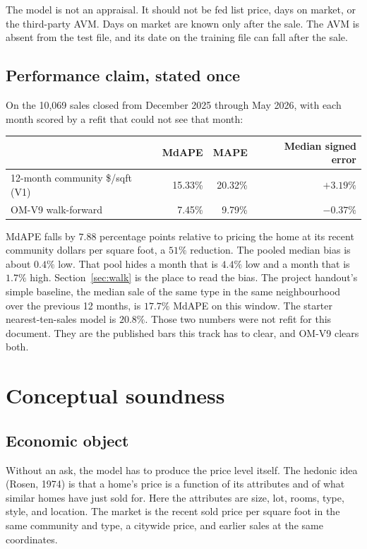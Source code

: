 \documentclass[11pt]{article}
\newcommand{\modelid}{OM-V9}
\begin{document}
The model is not an appraisal. It should not be fed list price, days on market, or the third-party AVM. Days on market are known only after the sale. The AVM is absent from the test file, and its date on the training file can fall after the sale.

\subsection{Performance claim, stated once}

On the 10,069 sales closed from December 2025 through May 2026, with each month scored by a refit that could not see that month:

\begin{center}
\begin{tabular}{lrrr}
\toprule
 & MdAPE & MAPE & Median signed error \\
\midrule
12-month community \$/sqft (V1) & 15.33\% & 20.32\% & \(+3.19\%\) \\
\modelid{} walk-forward & 7.45\% & 9.79\% & \(-0.37\%\) \\
\bottomrule
\end{tabular}
\end{center}

MdAPE falls by \(7.88\) percentage points relative to pricing the home at its recent community dollars per square foot, a \(51\%\) reduction. The pooled median bias is about \(0.4\%\) low. That pool hides a month that is \(4.4\%\) low and a month that is \(1.7\%\) high. Section~\ref{sec:walk} is the place to read the bias. The project handout's simple baseline, the median sale of the same type in the same neighbourhood over the previous 12 months, is \(17.7\%\) MdAPE on this window. The starter nearest-ten-sales model is \(20.8\%\). Those two numbers were not refit for this document. They are the published bars this track has to clear, and \modelid{} clears both.

\section{Conceptual soundness}
\label{sec:concept}

\subsection{Economic object}

Without an ask, the model has to produce the price level itself. The hedonic idea (Rosen, 1974) is that a home's price is a function of its attributes and of what similar homes have just sold for. Here the attributes are size, lot, rooms, type, style, and location. The market is the recent sold price per square foot in the same community and type, a citywide price, and earlier sales at the same coordinates.
\end{document}
